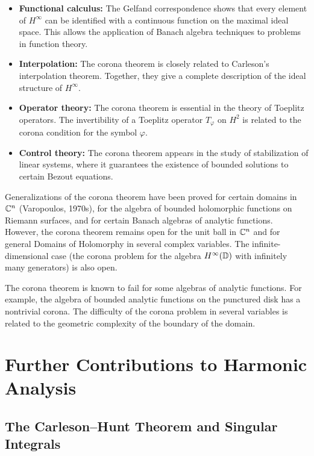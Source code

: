 \begin{itemize}
    \item \textbf{Functional calculus:} The Gelfand correspondence shows that every element of \(H^\infty\) can be identified with a continuous function on the maximal ideal space. This allows the application of Banach algebra techniques to problems in function theory.
    
    \item \textbf{Interpolation:} The corona theorem is closely related to Carleson's interpolation theorem. Together, they give a complete description of the ideal structure of \(H^\infty\).
    
    \item \textbf{Operator theory:} The corona theorem is essential in the theory of Toeplitz operators. The invertibility of a Toeplitz operator \(T_\varphi\) on \(H^2\) is related to the corona condition for the symbol \(\varphi\).
    
    \item \textbf{Control theory:} The corona theorem appears in the study of stabilization of linear systems, where it guarantees the existence of bounded solutions to certain Bezout equations.
\end{itemize}

Generalizations of the corona theorem have been proved for certain domains in \(\mathbb{C}^n\) (Varopoulos, 1970s), for the algebra of bounded holomorphic functions on Riemann surfaces, and for certain Banach algebras of analytic functions. However, the corona theorem remains open for the unit ball in \(\mathbb{C}^n\) and for general Domains of Holomorphy in several complex variables. The infinite-dimensional case (the corona problem for the algebra \(H^\infty(\mathbb{D})\) with infinitely many generators) is also open.

\begin{remark}
The corona theorem is known to fail for some algebras of analytic functions. For example, the algebra of bounded analytic functions on the punctured disk has a nontrivial corona. The difficulty of the corona problem in several variables is related to the geometric complexity of the boundary of the domain.
\end{remark}

\section{Further Contributions to Harmonic Analysis}

\subsection{The Carleson--Hunt Theorem and Singular Integrals}

